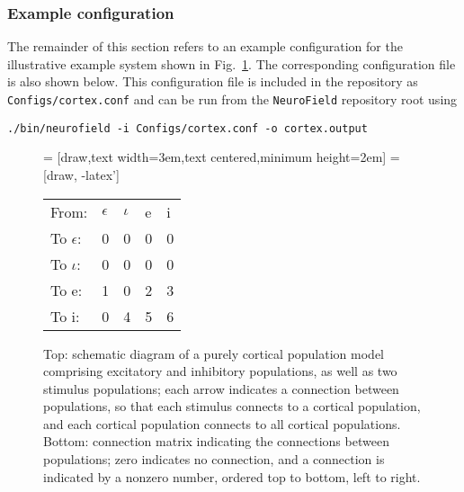 \documentclass[12pt,a4paper]{article}
\newcommand{\type}[1]{ {\small\small\tt #1} }
\newcommand{\NF}[0]{ \type{NeuroField}}
\begin{document}
\subsubsection{Example configuration}
The remainder of this section refers to an example configuration for the illustrative example system shown in Fig.~\ref{fig:cortical}. The corresponding configuration file is also shown below. This configuration file is included in the repository as \type{Configs/cortex.conf} and can be run from the \NF repository root using

\begin{lstlisting}
./bin/neurofield -i Configs/cortex.conf -o cortex.output
\end{lstlisting}

\begin{figure}[h!]
\begin{center}
 = [draw,text width=3em,text centered,minimum height=2em]
 = [draw, -latex']
\end{center}
\vspace{0.2cm}
\begin{center}
\begin{tabular}{ l l l l l }
	From:& $\epsilon$ & $\iota$ & e & i \\
	To $\epsilon$:& 0 & 0 & 0 & 0 \\
	To $\iota$:& 0 & 0 & 0 & 0 \\
	To e:& 1 & 0 & 2 & 3 \\
	To i:& 0 & 4 & 5 & 6
\end{tabular}
\end{center}
\caption{Top: schematic diagram of a purely cortical population model comprising excitatory and inhibitory populations, as well as two stimulus populations; each arrow indicates a connection between populations, so that each stimulus connects to a cortical population, and each cortical population connects to all cortical populations. Bottom: connection matrix indicating the connections between populations; zero indicates no connection, and a connection is indicated by a nonzero number, ordered top to bottom, left to right.}
\label{fig:cortical}
\end{figure}
\end{document}

